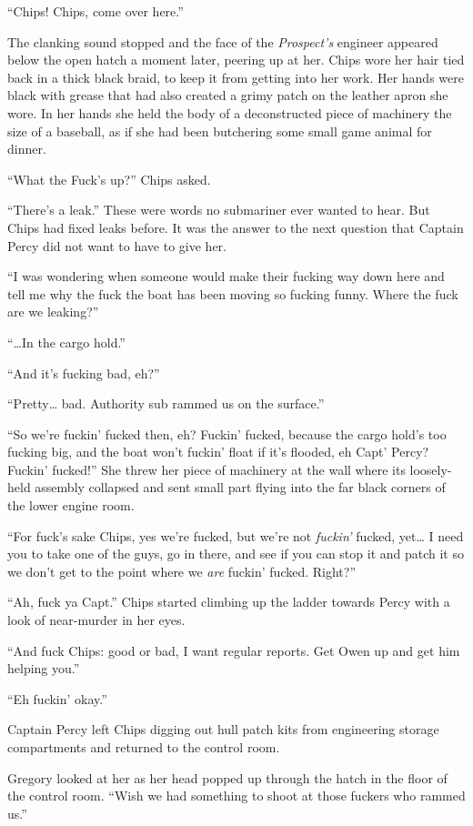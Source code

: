 \documentclass[]{article}
\begin{document}
``Chips! Chips, come over here.''

The clanking sound stopped and the face of the \emph{Prospect's}
engineer appeared below the open hatch a moment later, peering up at
her. Chips wore her hair tied back in a thick black braid, to keep it
from getting into her work. Her hands were black with grease that had
also created a grimy patch on the leather apron she wore. In her hands
she held the body of a deconstructed piece of machinery the size of a
baseball, as if she had been butchering some small game animal for
dinner.

``What the Fuck's up?'' Chips asked.

``There's a leak.'' These were words no submariner ever wanted to hear.
But Chips had fixed leaks before. It was the answer to the next question
that Captain Percy did not want to have to give her.

``I was wondering when someone would make their fucking way down here
and tell me why the fuck the boat has been moving so fucking funny.
Where the fuck are we leaking?''

``\ldots{}In the cargo hold.''

``And it's fucking bad, eh?''

``Pretty\ldots{} bad. Authority sub rammed us on the surface.''

``So we're fuckin' fucked then, eh? Fuckin' fucked, because the cargo
hold's too fucking big, and the boat won't fuckin' float if it's
flooded, eh Capt' Percy? Fuckin' fucked!'' She threw her piece of
machinery at the wall where its loosely-held assembly collapsed and sent
small part flying into the far black corners of the lower engine room.

``For fuck's sake Chips, yes we're fucked, but we're not \emph{fuckin'}
fucked, yet\ldots{} I need you to take one of the guys, go in there, and
see if you can stop it and patch it so we don't get to the point where
we \emph{are} fuckin' fucked. Right?''

``Ah, fuck ya Capt.'' Chips started climbing up the ladder towards Percy
with a look of near-murder in her eyes.

``And fuck Chips: good or bad, I want regular reports. Get Owen up and
get him helping you.''

``Eh fuckin' okay.''

Captain Percy left Chips digging out hull patch kits from engineering
storage compartments and returned to the control room.

Gregory looked at her as her head popped up through the hatch in the
floor of the control room. ``Wish we had something to shoot at those
fuckers who rammed us.''
\end{document}
